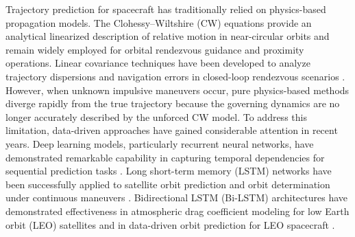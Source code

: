 \documentclass[a4paper,fleqn]{cas-dc}
\begin{document}
Trajectory prediction for spacecraft has traditionally relied on physics-based propagation models. The Clohessy--Wiltshire (CW) equations \cite{clohessy1960terminal} provide an analytical linearized description of relative motion in near-circular orbits and remain widely employed for orbital rendezvous guidance and proximity operations. Linear covariance techniques have been developed to analyze trajectory dispersions and navigation errors in closed-loop rendezvous scenarios \cite{geller2006linear}. However, when unknown impulsive maneuvers occur, pure physics-based methods diverge rapidly from the true trajectory because the governing dynamics are no longer accurately described by the unforced CW model. To address this limitation, data-driven approaches have gained considerable attention in recent years. Deep learning models, particularly recurrent neural networks, have demonstrated remarkable capability in capturing temporal dependencies for sequential prediction tasks \cite{hochreiter1997long, chung2014empirical}. Long short-term memory (LSTM) networks have been successfully applied to satellite orbit prediction and orbit determination under continuous maneuvers \cite{zhou2023lstm}. Bidirectional LSTM (Bi-LSTM) architectures have demonstrated effectiveness in atmospheric drag coefficient modeling for low Earth orbit (LEO) satellites \cite{chen2025bilstm} and in data-driven orbit prediction for LEO spacecraft \cite{ai2025bilstm}.
\end{document}
